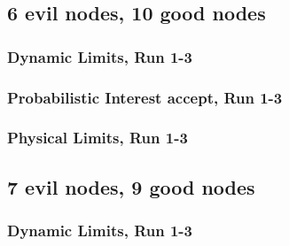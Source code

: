 \documentclass[onecolumn]{IEEEtran}
\begin{document}
\subsection{\textbf{6 evil nodes}, 10 good nodes}

\subsubsection{Dynamic Limits, Run 1-3}

\begin{minipage}[b]{\textwidth}

\end{minipage}

\clearpage

\subsubsection{Probabilistic Interest accept, Run 1-3}

\begin{minipage}[b]{\textwidth}

\end{minipage}

\clearpage

\subsubsection{Physical Limits, Run 1-3}

\begin{minipage}[b]{\textwidth}

\end{minipage}

\clearpage
\subsection{\textbf{7 evil nodes}, 9 good nodes}

\subsubsection{Dynamic Limits, Run 1-3}

\begin{minipage}[b]{\textwidth}

\end{minipage}
\end{document}
